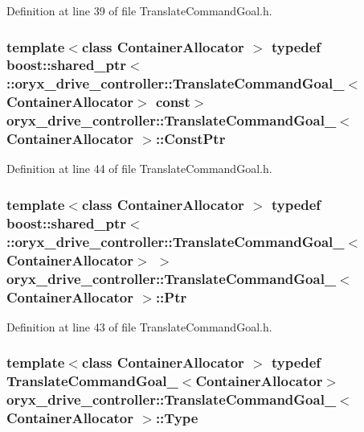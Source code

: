 \-Definition at line 39 of file \-Translate\-Command\-Goal.\-h.

\subsubsection[{\-Const\-Ptr}]{\setlength{\rightskip}{0pt plus 5cm}template$<$class Container\-Allocator $>$ typedef boost\-::shared\-\_\-ptr$<$ \-::{\bf oryx\-\_\-drive\-\_\-controller\-::\-Translate\-Command\-Goal\-\_\-}$<$\-Container\-Allocator$>$ const$>$ {\bf oryx\-\_\-drive\-\_\-controller\-::\-Translate\-Command\-Goal\-\_\-}$<$ \-Container\-Allocator $>$\-::{\bf \-Const\-Ptr}}\label{structoryx__drive__controller_1_1TranslateCommandGoal___a34fcf1e67e45146d6f98cbc6602e9b2b}


\-Definition at line 44 of file \-Translate\-Command\-Goal.\-h.

\subsubsection[{\-Ptr}]{\setlength{\rightskip}{0pt plus 5cm}template$<$class Container\-Allocator $>$ typedef boost\-::shared\-\_\-ptr$<$ \-::{\bf oryx\-\_\-drive\-\_\-controller\-::\-Translate\-Command\-Goal\-\_\-}$<$\-Container\-Allocator$>$ $>$ {\bf oryx\-\_\-drive\-\_\-controller\-::\-Translate\-Command\-Goal\-\_\-}$<$ \-Container\-Allocator $>$\-::{\bf \-Ptr}}\label{structoryx__drive__controller_1_1TranslateCommandGoal___a3f6dc9b27a99b34d14d349a477704107}


\-Definition at line 43 of file \-Translate\-Command\-Goal.\-h.

\subsubsection[{\-Type}]{\setlength{\rightskip}{0pt plus 5cm}template$<$class Container\-Allocator $>$ typedef {\bf \-Translate\-Command\-Goal\-\_\-}$<$\-Container\-Allocator$>$ {\bf oryx\-\_\-drive\-\_\-controller\-::\-Translate\-Command\-Goal\-\_\-}$<$ \-Container\-Allocator $>$\-::{\bf \-Type}}\label{structoryx__drive__controller_1_1TranslateCommandGoal___a8ef00130adb25f452772c11fcce524c7}


